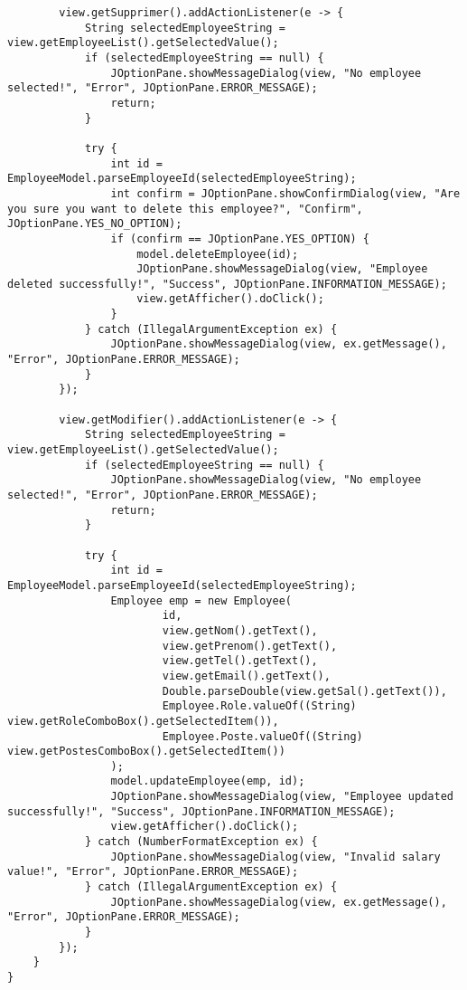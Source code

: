 \documentclass[12pt,a4paper]{article}
\begin{document}
\begin{lstlisting}
        view.getSupprimer().addActionListener(e -> {
            String selectedEmployeeString = view.getEmployeeList().getSelectedValue();
            if (selectedEmployeeString == null) {
                JOptionPane.showMessageDialog(view, "No employee selected!", "Error", JOptionPane.ERROR_MESSAGE);
                return;
            }

            try {
                int id = EmployeeModel.parseEmployeeId(selectedEmployeeString);
                int confirm = JOptionPane.showConfirmDialog(view, "Are you sure you want to delete this employee?", "Confirm", JOptionPane.YES_NO_OPTION);
                if (confirm == JOptionPane.YES_OPTION) {
                    model.deleteEmployee(id);
                    JOptionPane.showMessageDialog(view, "Employee deleted successfully!", "Success", JOptionPane.INFORMATION_MESSAGE);
                    view.getAfficher().doClick();
                }
            } catch (IllegalArgumentException ex) {
                JOptionPane.showMessageDialog(view, ex.getMessage(), "Error", JOptionPane.ERROR_MESSAGE);
            }
        });

        view.getModifier().addActionListener(e -> {
            String selectedEmployeeString = view.getEmployeeList().getSelectedValue();
            if (selectedEmployeeString == null) {
                JOptionPane.showMessageDialog(view, "No employee selected!", "Error", JOptionPane.ERROR_MESSAGE);
                return;
            }

            try {
                int id = EmployeeModel.parseEmployeeId(selectedEmployeeString);
                Employee emp = new Employee(
                        id,
                        view.getNom().getText(),
                        view.getPrenom().getText(),
                        view.getTel().getText(),
                        view.getEmail().getText(),
                        Double.parseDouble(view.getSal().getText()),
                        Employee.Role.valueOf((String) view.getRoleComboBox().getSelectedItem()),
                        Employee.Poste.valueOf((String) view.getPostesComboBox().getSelectedItem())
                );
                model.updateEmployee(emp, id);
                JOptionPane.showMessageDialog(view, "Employee updated successfully!", "Success", JOptionPane.INFORMATION_MESSAGE);
                view.getAfficher().doClick();
            } catch (NumberFormatException ex) {
                JOptionPane.showMessageDialog(view, "Invalid salary value!", "Error", JOptionPane.ERROR_MESSAGE);
            } catch (IllegalArgumentException ex) {
                JOptionPane.showMessageDialog(view, ex.getMessage(), "Error", JOptionPane.ERROR_MESSAGE);
            }
        });
    }
}

\end{lstlisting}
\end{document}

